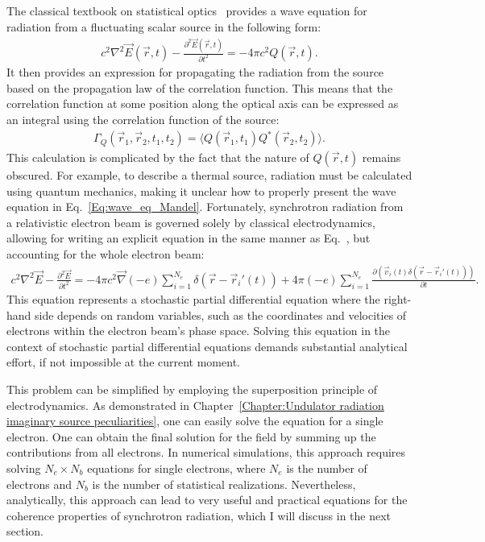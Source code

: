     The classical textbook on statistical optics~\cite{mandel_optical_1995} provides a wave equation for radiation from a fluctuating scalar source in the following form:
    \begin{align}
        c^2 \nabla^2 \vec{E}(\vec{r}, t) - \frac{\partial^2 \vec{E}(\vec{r}, t)}{\partial t^2} = -4 \pi c^2 Q(\vec{r}, t).
        \label{Eq:mandel_Eq}
    \end{align}
    It then provides an expression for propagating the radiation from the source based on the propagation law of the correlation function. This means that the correlation function at some position along the optical axis can be expressed as an integral using the correlation function of the source:
    \begin{align}
        \Gamma_Q(\vec{r}_1, \vec{r}_2, t_1, t_2) = \langle  Q(\vec{r}_1, t_1)  Q^*(\vec{r}_2, t_2) \rangle.
        \label{Eq:wave_eq_Mandel}
    \end{align}
    This calculation is complicated by the fact that the nature of $Q(\vec{r}, t)$ remains obscured. For example, to describe a thermal source, radiation must be calculated using quantum mechanics, making it unclear how to properly present the wave equation in Eq.~\ref{Eq:wave_eq_Mandel}. Fortunately, synchrotron radiation from a relativistic electron beam is governed solely by classical electrodynamics, allowing for writing an explicit equation in the same manner as Eq.~\rr{}, but accounting for the whole electron beam:
    \begin{align}
        c^2 \nabla^2 \vec{E} - \frac{\partial^2 \vec{E}}{\partial t^2} = - 4 \pi c^2 \vec{\nabla} (-e) \sum_{i=1}^{N_e}\delta(\vec{r} - \vec{r}_i'(t)) + 4 \pi (-e) \sum_{i=1}^{N_e}\frac{\partial (\vec{v}_i(t)\delta(\vec{r} - \vec{r}_i'(t)))}{\partial t}.
    \end{align}
    This equation represents a stochastic partial differential equation where the right-hand side depends on random variables, such as the coordinates and velocities of electrons within the electron beam's phase space. Solving this equation in the context of stochastic partial differential equations demands substantial analytical effort, if not impossible at the current moment.

    This problem can be simplified by employing the superposition principle of electrodynamics. As demonstrated in Chapter~\ref{Chapter:Undulator radiation imaginary source peculiarities}, one can easily solve the equation for a single electron. One can obtain the final solution for the field by summing up the contributions from all electrons. In numerical simulations, this approach requires solving $N_e \times N_b$ equations for single electrons, where $N_e$ is the number of electrons and $N_b$ is the number of statistical realizations. Nevertheless, analytically, this approach can lead to very useful and practical equations for the coherence properties of synchrotron radiation, which I will discuss in the next section.
    
